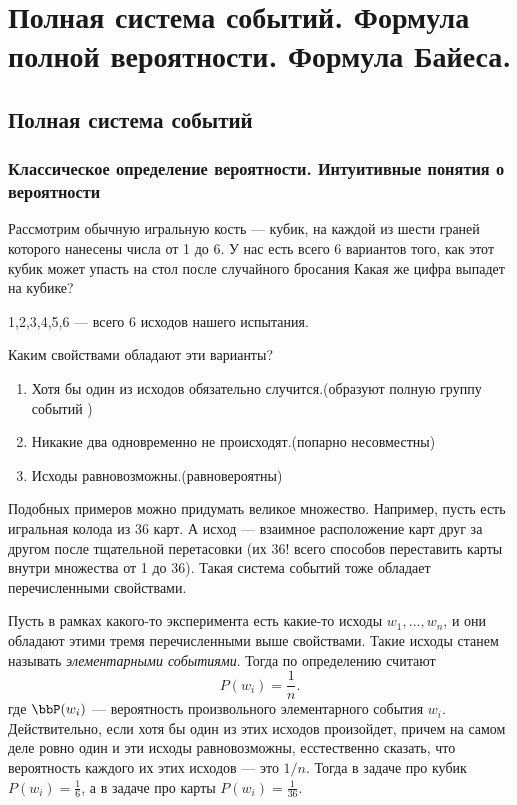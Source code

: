 \chapter{Полная система событий. Формула полной вероятности. Формула Байеса.}
\section{Полная система событий}

\subsection{Классическое определение вероятности. Интуитивные понятия о вероятности}

Рассмотрим обычную игральную кость --- кубик, на каждой из шести граней которого нанесены числа от 1 до 6. У нас есть всего 6 вариантов того, как этот кубик может упасть на стол после случайного бросания Какая же цифра выпадет на кубике? 
\begin{center}
1,2,3,4,5,6 --- всего 6 исходов нашего испытания.
\end{center}
Каким свойствами обладают эти варианты?
\begin{enumerate}
\item Хотя бы один из исходов обязательно случится.(образуют полную группу событий )
\item Никакие два одновременно не происходят.(попарно несовместны)
\item Исходы равновозможны.(равновероятны)
\end{enumerate}

Подобных примеров можно придумать великое множество. Например, пусть есть игральная колода из 36 карт. А исход --- взаимное расположение карт друг за другом после тщательной перетасовки (их 36! всего способов переставить карты внутри множества от 1 до 36). Такая система событий тоже обладает перечисленными свойствами.

Пусть в рамках какого-то эксперимента есть какие-то исходы $w_1, \dots,w_n$, и они обладают этими тремя перечисленными выше свойствами. Такие исходы станем называть \textit{элементарными событиями}. Тогда по определению считают
$$
P(w_i)=\frac{1}{n}.
$$
где $\bbP(w_i)$ --- вероятность произвольного элементарного события $w_i$. Действительно, если хотя бы один из этих исходов произойдет, причем на самом деле ровно один и эти исходы равновозможны, есстественно сказать, что вероятность каждого их этих исходов --- это $1/n$. Тогда в задаче про кубик $P(w_i) =\frac{1}{6}$, а в задаче про карты $P(w_i) = \frac{1}{36}$.

